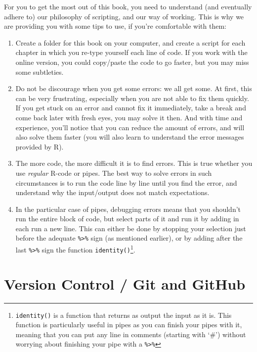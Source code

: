 \documentclass[
]{krantz}
\begin{document}
For you to get the most out of this book, you need to understand (and eventually adhere to) our philosophy of scripting, and our way of working. This is why we are providing you with some tips to use, if you're comfortable with them:

\begin{enumerate}
\def\labelenumi{\arabic{enumi}.}
\item
  Create a folder for this book on your computer, and create a script for each chapter in which you re-type yourself each line of code. If you work with the online version, you could copy/paste the code to go faster, but you may miss some subtleties.
\item
  Do not be discourage when you get some errors: we all get some. At first, this can be very frustrating, especially when you are not able to fix them quickly. If you get stuck on an error and cannot fix it immediately, take a break and come back later with fresh eyes, you may solve it then. And with time and experience, you'll notice that you can reduce the amount of errors, and will also solve them faster (you will also learn to understand the error messages provided by R).
\item
  The more code, the more difficult it is to find errors. This is true whether you use \emph{regular} R-code or pipes. The best way to solve errors in such circumstances is to run the code line by line until you find the error, and understand why the input/output does not match expectations.
\item
  In the particular case of pipes, debugging errors means that you shouldn't run the entire block of code, but select parts of it and run it by adding in each run a new line. This can either be done by stopping your selection just before the adequate \texttt{\%\textgreater{}\%} sign (as mentioned earlier), or by adding after the last \texttt{\%\textgreater{}\%} sign the function \texttt{identity()}\footnote{\texttt{identity()} is a function that returns as output the input as it is. This function is particularly useful in pipes as you can finish your pipes with it, meaning that you can put any line in comments (starting with `\#') without worrying about finishing your pipe with a \texttt{\%\textgreater{}\%}}.
\end{enumerate}

\hypertarget{git-and-github}{%
\section{Version Control / Git and GitHub}\label{git-and-github}}
\end{document}
